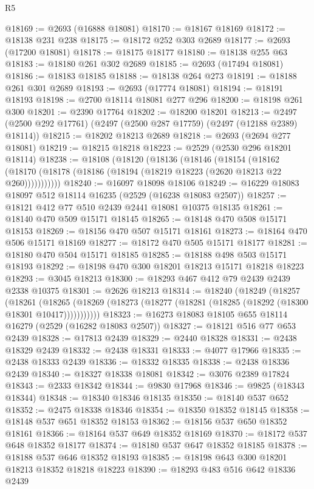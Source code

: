 \begin{lexlean}{R5}
\begin{coremodule}
@18169 := @2693 (@16888 @18081)
@18170 := @18167 @18169
@18172 := @18138 @231 @238
@18175 := @18172 @252 @303 @2689
@18177 := @2693 (@17200 @18081)
@18178 := @18175 @18177
@18180 := @18138 @255 @63
@18183 := @18180 @261 @302 @2689
@18185 := @2693 (@17494 @18081)
@18186 := @18183 @18185
@18188 := @18138 @264 @273
@18191 := @18188 @261 @301 @2689
@18193 := @2693 (@17774 @18081)
@18194 := @18191 @18193
@18198 := @2700 @18114 @18081 @277 @296
@18200 := @18198 @261 @300
@18201 := @2390 @17764
@18202 := @18200 @18201
@18213 := @2497 (@2500 @292 @17761) (@2497 (@2500 @287 @17759) (@2497 (@12188 @2389) @18114))
@18215 := @18202 @18213 @2689
@18218 := @2693 (@2694 @277 @18081)
@18219 := @18215 @18218
@18223 := @2529 (@2530 @296 @18201 @18114)
@18238 := @18108
    (@18120
      (@18136
        (@18146
          (@18154
            (@18162 (@18170 (@18178 (@18186 (@18194 (@18219 @18223 (@2620 @18213 @22 @260)))))))))))
@18240 := @16097 @18098 @18106
@18249 := @16229 @18083 @18097 @512 @18114 @16235 (@2529 (@16238 @18083 @2507))
@18257 := @18121 @412 @77 @510 @2439 @2441 @18081 @10375 @18135
@18261 := @18140 @470 @509 @15171 @18145
@18265 := @18148 @470 @508 @15171 @18153
@18269 := @18156 @470 @507 @15171 @18161
@18273 := @18164 @470 @506 @15171 @18169
@18277 := @18172 @470 @505 @15171 @18177
@18281 := @18180 @470 @504 @15171 @18185
@18285 := @18188 @498 @503 @15171 @18193
@18292 := @18198 @470 @300 @18201 @18213 @15171 @18218 @18223
@18293 := @3045 @18213
@18300 := @18293 @467 @412 @79 @2439 @2439 @2338 @10375
@18301 := @2626 @18213
@18314 := @18240
    (@18249
      (@18257
        (@18261
          (@18265 (@18269 (@18273 (@18277 (@18281 (@18285 (@18292 (@18300 @18301 @10417)))))))))))
@18323 := @16273 @18083 @18105 @655 @18114 @16279 (@2529 (@16282 @18083 @2507))
@18327 := @18121 @516 @77 @653 @2439
@18328 := @17813 @2439
@18329 := @2440 @18328
@18331 := @2438 @18329 @2439
@18332 := @2438 @18331
@18333 := @4077 @17966
@18335 := @2438 @18333 @2439
@18336 := @18332 @18335
@18338 := @2438 @18336 @2439
@18340 := @18327 @18338 @18081
@18342 := @3076 @2389 @17824
@18343 := @2333 @18342
@18344 := @9830 @17968
@18346 := @9825 (@18343 @18344)
@18348 := @18340 @18346 @18135
@18350 := @18140 @537 @652
@18352 := @2475 @18338 @18346
@18354 := @18350 @18352 @18145
@18358 := @18148 @537 @651 @18352 @18153
@18362 := @18156 @537 @650 @18352 @18161
@18366 := @18164 @537 @649 @18352 @18169
@18370 := @18172 @537 @648 @18352 @18177
@18374 := @18180 @537 @647 @18352 @18185
@18378 := @18188 @537 @646 @18352 @18193
@18385 := @18198 @643 @300 @18201 @18213 @18352 @18218 @18223
@18390 := @18293 @483 @516 @642 @18336 @2439

\end{coremodule}
\end{lexlean}
